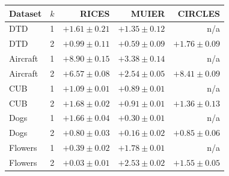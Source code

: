 \begin{tabular}{llrrr}
\toprule
Dataset & $k$ & RICES & MUIER & CIRCLES \\
\midrule
DTD & 1 & $+1.61 \pm 0.21$ & $+1.35 \pm 0.12$ & n/a \\
DTD & 2 & $+0.99 \pm 0.11$ & $+0.59 \pm 0.09$ & $+1.76 \pm 0.09$ \\
Aircraft & 1 & $+8.90 \pm 0.15$ & $+3.38 \pm 0.14$ & n/a \\
Aircraft & 2 & $+6.57 \pm 0.08$ & $+2.54 \pm 0.05$ & $+8.41 \pm 0.09$ \\
CUB & 1 & $+1.09 \pm 0.01$ & $+0.89 \pm 0.01$ & n/a \\
CUB & 2 & $+1.68 \pm 0.02$ & $+0.91 \pm 0.01$ & $+1.36 \pm 0.13$ \\
Dogs & 1 & $+1.66 \pm 0.04$ & $+0.30 \pm 0.01$ & n/a \\
Dogs & 2 & $+0.80 \pm 0.03$ & $+0.16 \pm 0.02$ & $+0.85 \pm 0.06$ \\
Flowers & 1 & $+0.39 \pm 0.02$ & $+1.78 \pm 0.01$ & n/a \\
Flowers & 2 & $+0.03 \pm 0.01$ & $+2.53 \pm 0.02$ & $+1.55 \pm 0.05$ \\
\bottomrule
\end{tabular}
